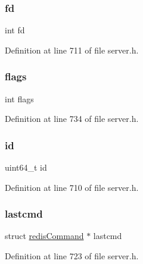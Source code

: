 \mbox{\label{structclient_a6f8059414f0228f0256115e024eeed4b}} 
\subsubsection{\texorpdfstring{fd}{fd}}
{\footnotesize\ttfamily int fd}



Definition at line 711 of file server.\+h.

\mbox{\label{structclient_ac8bf36fe0577cba66bccda3a6f7e80a4}} 
\subsubsection{\texorpdfstring{flags}{flags}}
{\footnotesize\ttfamily int flags}



Definition at line 734 of file server.\+h.

\mbox{\label{structclient_a7e290573ef1be67b92a2c745e3b00d1d}} 
\subsubsection{\texorpdfstring{id}{id}}
{\footnotesize\ttfamily uint64\+\_\+t id}



Definition at line 710 of file server.\+h.

\mbox{\label{structclient_a81d89da91093b6bd8a49acf4a58d47b4}} 
\subsubsection{\texorpdfstring{lastcmd}{lastcmd}}
{\footnotesize\ttfamily struct \hyperlink{structredis_command}{redis\+Command} $\ast$ lastcmd}



Definition at line 723 of file server.\+h.

\mbox{\label{structclient_a08c13433165f221a86bc5c3160f17c82}} 
